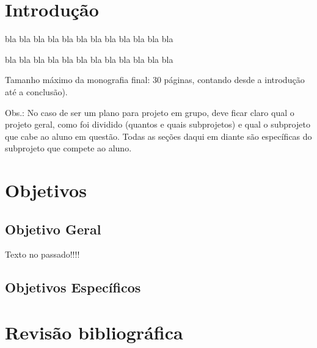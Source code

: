 \documentclass[12pt,a4paper,espaco=umemeio,noindentfirst,oneside,openany,tocpage=plain,pnumromarab,ruledheader,time,anapcustomindent]{abnt}
\begin{document}
\listadefiguras

\listadetabelas

\sumario


\chapter{Introdução} %


bla bla bla bla bla bla bla bla bla bla bla bla

bla bla bla bla bla bla bla bla bla bla bla bla

{\Large Tamanho máximo da monografia final: 30 páginas, contando desde a introdução até a conclusão).

Obs.: No caso de ser um plano para projeto em grupo, deve ficar claro qual o projeto geral, como foi dividido (quantos e quais subprojetos) e qual o subprojeto que cabe ao aluno em questão. Todas as seções daqui em diante são específicas do subprojeto que compete ao aluno.}



\chapter{Objetivos}


\section{Objetivo Geral}

Texto no passado!!!!

\section{Objetivos Específicos}



\chapter{Revisão bibliográfica}
\end{document}
